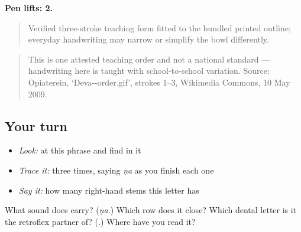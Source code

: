 \textbf{Pen lifts: 2.}

\begin{quote}
Verified three-stroke teaching form fitted to the bundled printed outline; everyday handwriting may narrow or simplify the bowl differently.
\end{quote}

\begin{quote}
This is one attested teaching order and not a national standard — handwriting here is taught with school-to-school variation. Source: Opiaterein, ‘Deva--order.gif’, strokes 1–3, Wikimedia Commons, 10 May 2009.
\end{quote}

\subsection*{Your turn}
\begin{itemize}
\raggedright
  \item \emph{Look:} at this phrase and find  in it
\end{itemize}

\begin{quote}
 
\end{quote}

\begin{itemize}
\raggedright
  \item \emph{Trace it:}  three times, saying \emph{ṇa} as you finish each one
  \item \emph{Say it:} how many right-hand stems this letter has
\end{itemize}

\begin{tcolorbox}[breakable,colback=teal!4,colframe=teal!35!black,title={Before you move on}]
What sound does \textbf{} carry? (\emph{ṇa}.) Which row does it close? Which dental letter is it the retroflex partner of? (\textbf{}.) Where have you read it?
\end{tcolorbox}
